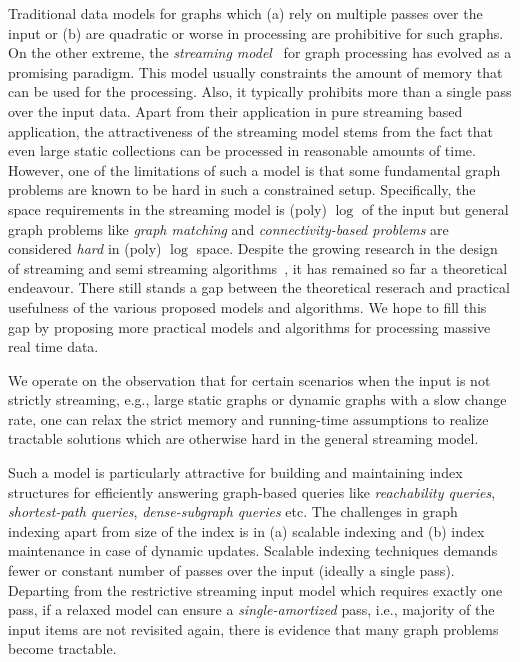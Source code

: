 Traditional data models for graphs which (a) rely on multiple passes over the input or (b) are quadratic or worse in processing are prohibitive for such graphs. On the other extreme, the \emph{streaming model}~\cite{Henzinger,Feigenbaum, Alon} for graph processing has evolved as a promising paradigm. This model usually constraints the amount of memory that can be used for the processing. Also, it typically prohibits more than a single pass over the input data. Apart from their application in pure streaming based application, the attractiveness of the streaming model stems from the fact that even large static collections can be processed in reasonable amounts of time. However, one of the limitations of such a model is that some fundamental graph problems are known to be hard in such a constrained setup. Specifically, the space requirements in the streaming model is (poly) $\log$ of the input but general graph problems like \emph{graph matching} and \emph{connectivity-based problems} are considered \emph{hard} in (poly) $\log$ space. Despite the growing research in the design of streaming and semi streaming algorithms~\cite{Henzinger}, it has remained so far a theoretical endeavour. There still stands a gap between the theoretical reserach and practical usefulness of the various proposed models and algorithms. We hope to fill this gap by proposing more practical models and algorithms for processing massive real time data.

We operate on the observation that for certain scenarios when the input is not strictly streaming, e.g., large static graphs or dynamic graphs with a slow change rate, one can relax the strict memory and running-time assumptions to realize tractable solutions which are otherwise hard in the general streaming model.

Such a model is particularly attractive for building and maintaining index structures for efficiently answering graph-based queries like \emph{reachability queries}, \emph{shortest-path queries}, \emph{dense-subgraph queries} etc. The challenges in graph indexing apart from size of the index is in (a) scalable indexing and (b) index maintenance in case of dynamic updates. Scalable indexing techniques demands fewer or constant number of passes over the input (ideally a single pass). Departing from the restrictive streaming input model which requires exactly one pass, if a relaxed model can ensure a \emph{single-amortized} pass, i.e., majority of the input items are not revisited again, there is evidence that many graph problems become tractable. 

